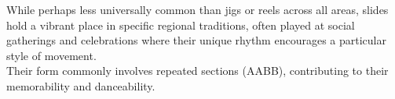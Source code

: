 \begin{multicols}{2}
{      While perhaps less universally common than jigs or reels across all areas, 
      slides hold a vibrant place in specific regional traditions, often played 
      at social gatherings and celebrations where their unique rhythm encourages 
      a particular style of movement.\\
      
      Their form commonly involves repeated sections (AABB), contributing to their 
      memorability and danceability.
    }

    \end{multicols}